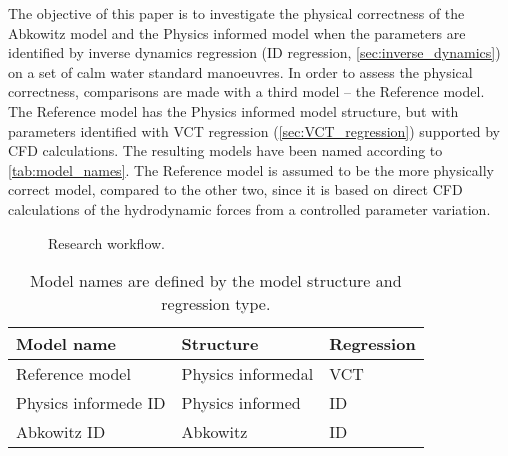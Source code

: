 The objective of this paper is to investigate the physical correctness of the Abkowitz model and the Physics informed model when the parameters are identified by inverse dynamics regression (ID regression, \autoref{sec:inverse_dynamics}) on a set of calm water standard manoeuvres. In order to assess the physical correctness, comparisons are made with a third model -- the Reference model. The Reference model has the Physics informed model structure, but with parameters identified with VCT regression (\autoref{sec:VCT_regression}) supported by CFD calculations. The resulting models have been named according to \autoref{tab:model_names}.
The Reference model is assumed to be the more physically correct model, compared to the other two, since it is based on direct CFD calculations of the hydrodynamic forces from a controlled parameter variation.
%
\begin{figure}[h]
    \centering
    
    \caption{Research workflow.}
    \label{fig:methodology}
\end{figure}
%
\begin{table}[h]
    \caption{Model names are defined by the model structure and regression type.}
    \label{tab:model_names}
    \centering
    \begin{tabular}{l l l}
        Model name                           & Structure      & Regression \\
        \hline
        Reference model & Physics informedal & VCT                         \\
        Physics informede ID  & Physics informed & ID         \\
        Abkowitz ID                          & Abkowitz       & ID         \\
    \end{tabular}
\end{table}